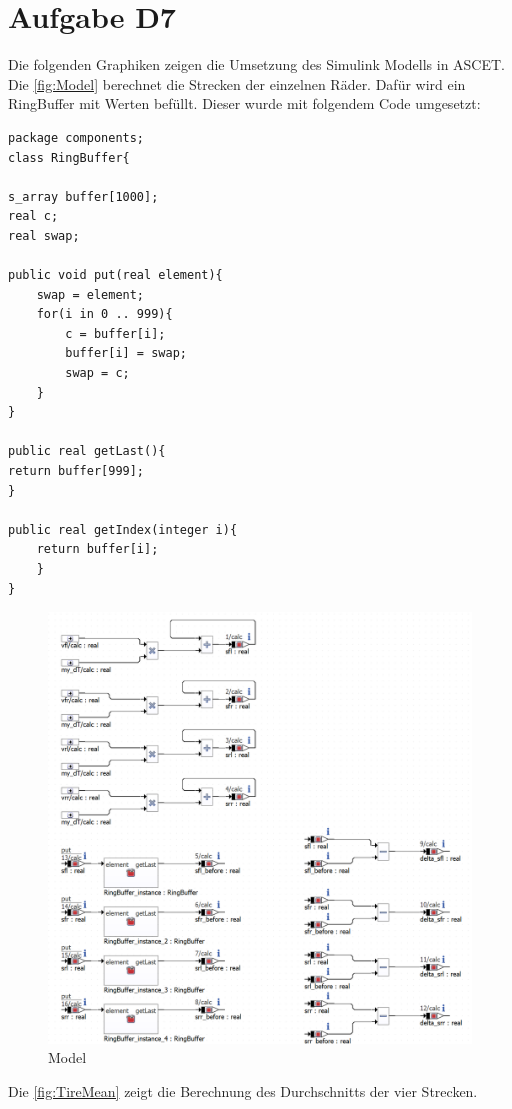 
\chapter{Aufgabe D7}
Die folgenden Graphiken zeigen die Umsetzung des Simulink Modells in ASCET. Die \autoref{fig:Model} berechnet die Strecken der einzelnen Räder. Dafür wird ein RingBuffer mit Werten befüllt. Dieser wurde mit folgendem Code umgesetzt:\\
\begin{lstlisting}
package components;
class RingBuffer{

s_array buffer[1000];    
real c;
real swap;

public void put(real element){
	swap = element;
	for(i in 0 .. 999){
		c = buffer[i];
		buffer[i] = swap;
		swap = c;
	}
}

public real getLast(){
return buffer[999];
}

public real getIndex(integer i){
	return buffer[i];
	}
}
\end{lstlisting}
\begin{figure}[h!]
	\centering
	\includegraphics[width=1\linewidth]{../Graphiken/Model.png}
	\caption{Model}
	\label{fig:Model}
\end{figure}

Die \autoref{fig:TireMean} zeigt die Berechnung des Durchschnitts der vier Strecken.

